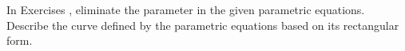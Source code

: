 {\noindent In Exercises}
{, eliminate the parameter in the given parametric equations. Describe the curve defined by the parametric equations based on its rectangular form.
}
